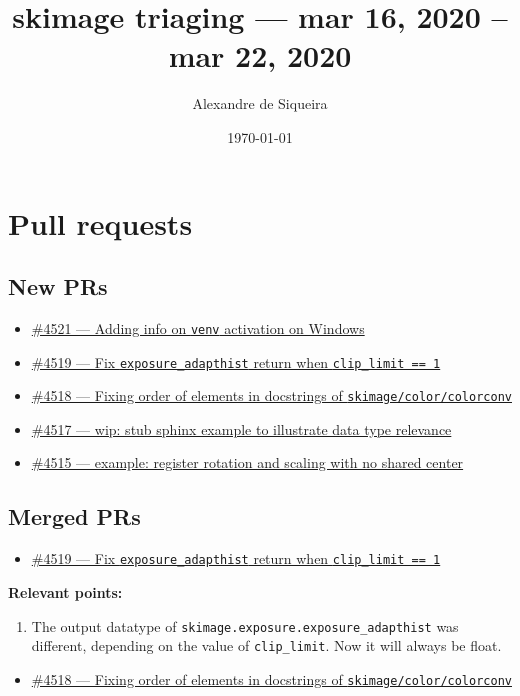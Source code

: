 \documentclass[11pt]{article}
\author{Alexandre de Siqueira}
\date{\today}
\title{skimage triaging — mar 16, 2020 – mar 22, 2020}
\begin{document}
\maketitle
\tableofcontents


\section{Pull requests}
\label{sec:orga8056cc}

\subsection{New PRs}
\label{sec:org89c156a}

\begin{itemize}
\item \href{https://github.com/scikit-image/scikit-image/pull/4521}{\#4521 — Adding info on \texttt{venv} activation on Windows}

\item \href{https://github.com/scikit-image/scikit-image/pull/4519}{\#4519 — Fix \texttt{exposure\_adapthist} return when \texttt{clip\_limit == 1}}

\item \href{https://github.com/scikit-image/scikit-image/pull/4518}{\#4518 — Fixing order of elements in docstrings of \texttt{skimage/color/colorconv}}

\item \href{https://github.com/scikit-image/scikit-image/pull/4517}{\#4517 — wip: stub sphinx example to illustrate data type relevance}

\item \href{https://github.com/scikit-image/scikit-image/pull/4515}{\#4515 — example: register rotation and scaling with no shared center}
\end{itemize}


\subsection{Merged PRs}
\label{sec:org6d4d19b}

\begin{itemize}
\item \href{https://github.com/scikit-image/scikit-image/pull/4519}{\#4519 — Fix \texttt{exposure\_adapthist} return when \texttt{clip\_limit == 1}}
\end{itemize}

\textbf{Relevant points:}
\begin{enumerate}
\item The output datatype of \texttt{skimage.exposure.exposure\_adapthist} was different,
depending on the value of \texttt{clip\_limit}. Now it will always be float.
\end{enumerate}
\begin{itemize}
\item \href{https://github.com/scikit-image/scikit-image/pull/4518}{\#4518 — Fixing order of elements in docstrings of \texttt{skimage/color/colorconv}}
\end{itemize}
\end{document}
